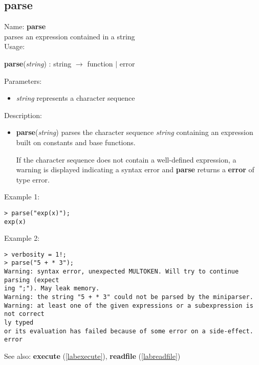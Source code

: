 \subsection{parse}
\label{labparse}
\noindent Name: \textbf{parse}\\
parses an expression contained in a string\\

\noindent Usage: 
\begin{center}
\textbf{parse}(\emph{string}) : \textsf{string} $\rightarrow$ \textsf{function} $|$ \textsf{error}\\
\end{center}
Parameters: 
\begin{itemize}
\item \emph{string} represents a character sequence
\end{itemize}
\noindent Description: \begin{itemize}

\item \textbf{parse}(\emph{string}) parses the character sequence \emph{string} containing
   an expression built on constants and base functions.
    
   If the character sequence does not contain a well-defined expression,
   a warning is displayed indicating a syntax error and \textbf{parse} returns
   a \textbf{error} of type \textsf{error}.
\end{itemize}
\noindent Example 1: 
\begin{center}\begin{minipage}{15cm}\begin{Verbatim}[frame=single]
> parse("exp(x)");
exp(x)
\end{Verbatim}
\end{minipage}\end{center}
\noindent Example 2: 
\begin{center}\begin{minipage}{15cm}\begin{Verbatim}[frame=single]
> verbosity = 1!;
> parse("5 + * 3");
Warning: syntax error, unexpected MULTOKEN. Will try to continue parsing (expect
ing ";"). May leak memory.
Warning: the string "5 + * 3" could not be parsed by the miniparser.
Warning: at least one of the given expressions or a subexpression is not correct
ly typed
or its evaluation has failed because of some error on a side-effect.
error
\end{Verbatim}
\end{minipage}\end{center}
See also: \textbf{execute} (\ref{labexecute}), \textbf{readfile} (\ref{labreadfile})
